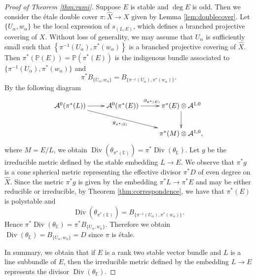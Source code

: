 \documentclass[12pt]{article}
\begin{document}
\begin{proof}[Proof of Theorem \ref{thm:rami}]
Suppose $E$ is stable and $\deg E$ is odd. Then we consider the \'etale double cover $\pi \colon \widehat{X} \to X$ given by Lemma \ref{lem:doublecover}. Let $\{ U_{\alpha}, w_{\alpha} \}$ be the local expression of $s_{(L,E)}$, which defines a branched projective covering of $X$.  Without loss of generality, we may assume that $U_{\alpha}$ is sufficiently small such that $\left\{\pi^{-1}(U_{\alpha}), \pi^*(w_{\alpha})\right\}$ is a branched projective covering of $\widehat{X}$. Then $\pi^*(\mathbb P(E)) = \mathbb{P}(\pi^*(E))$ is the indigenous bundle associated to $\{\pi^{-1}(U_{\alpha}), \pi^*(w_{\alpha})\}$ and
\[ \pi^{*} B_{\{U_{\alpha}, w_{\alpha}\}} = B_{\{\pi^{-1}(U_{\alpha}), \pi^*(w_{\alpha})\}}. \]
By the following diagram
\[\xymatrix{
 \mathcal A^{0}(\pi^{*}(L))\ar[r] \ar[drr]_-{\theta_{\pi^{*}({\mathbb E})}} & \mathcal A^{0}(\pi^{*}(E))\ar[r] ^{\partial_{\pi^{*}(E)}} & \pi^{*}(E) \otimes \mathcal{A}^{1,0}\ar[d] \\
 & & \pi^{*}(M) \otimes \mathcal{A}^{1,0},
}\]
where $M = E / L$, we obtain $\operatorname{Div}(\theta_{\pi^{*}({\mathbb E})}) = \pi^{*} \operatorname{Div}(\theta_{\mathbb E})$. Let $g$ be the irreducible metric defined by the stable embedding $L\to E$. We observe that $\pi^*g$ is a cone spherical metric representing the effective divisor $\pi^*D$ of even degree on $\widehat X$. Since the metric $\pi^*g$ is given by the embedding $\pi^*L\to \pi^*E$ and may be either reducible or irreducible, by Theorem \ref{thm:correspondence}, we have that $\pi^{*}(E)$ is  polystable and
\[ \operatorname{Div}(\theta_{\pi^{*}({\mathbb E})}) = B_{\{\pi^{-1}(U_{\alpha}), \pi^*(w_{\alpha})\}}. \]
Hence $\pi^{*} \operatorname{Div}(\theta_{\mathbb E}) = \pi^{*} B_{\{U_{\alpha}, w_{\alpha}\}}$. Therefore we obtain $\operatorname{Div}(\theta_{\mathbb E}) = B_{\{U_{\alpha}, w_{\alpha}\}} = D$ since $\pi$ is \'etale.

In summary, we obtain that if $E$ is a rank two stable vector bundle and $L$ is a line subbundle of $E$, then the irreducible metric defined by the embedding $L \to E$ represents the divisor $\operatorname{Div}(\theta_{\mathbb E})$.
\end{proof}
\end{document}
